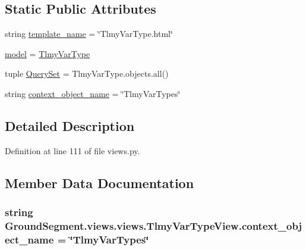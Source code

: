 \subsection*{Static Public Attributes}
\begin{DoxyCompactItemize}
\item 
string \hyperlink{class_ground_segment_1_1views_1_1views_1_1_tlmy_var_type_view_a92cf3128522367cfafc07cc0bc62dc93}{template\+\_\+name} = \char`\"{}Tlmy\+Var\+Type.\+html\char`\"{}
\item 
\hyperlink{class_ground_segment_1_1views_1_1views_1_1_tlmy_var_type_view_aef0db9ab01d7c69c00adedd9853ad6ab}{model} = \hyperlink{class_ground_segment_1_1models_1_1_tlmy_var_type_1_1_tlmy_var_type}{Tlmy\+Var\+Type}
\item 
tuple \hyperlink{class_ground_segment_1_1views_1_1views_1_1_tlmy_var_type_view_a1879e316cb50e58c2e4faf920c86c463}{Query\+Set} = Tlmy\+Var\+Type.\+objects.\+all()
\item 
string \hyperlink{class_ground_segment_1_1views_1_1views_1_1_tlmy_var_type_view_ab2ded0f297c9a43fe28f49f270fa1e62}{context\+\_\+object\+\_\+name} = \char`\"{}Tlmy\+Var\+Types\char`\"{}
\end{DoxyCompactItemize}


\subsection{Detailed Description}


Definition at line 111 of file views.\+py.



\subsection{Member Data Documentation}
\hypertarget{class_ground_segment_1_1views_1_1views_1_1_tlmy_var_type_view_ab2ded0f297c9a43fe28f49f270fa1e62}{}
\subsubsection[{context\+\_\+object\+\_\+name}]{\setlength{\rightskip}{0pt plus 5cm}string Ground\+Segment.\+views.\+views.\+Tlmy\+Var\+Type\+View.\+context\+\_\+object\+\_\+name = \char`\"{}Tlmy\+Var\+Types\char`\"{}\hspace{0.3cm}{\ttfamily [static]}}\label{class_ground_segment_1_1views_1_1views_1_1_tlmy_var_type_view_ab2ded0f297c9a43fe28f49f270fa1e62}


